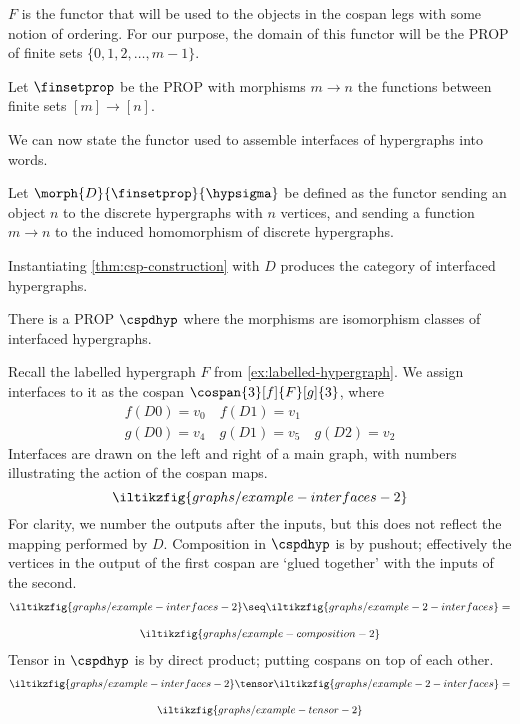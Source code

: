 \(F\) is the functor that will be used to the objects in the cospan legs with
some notion of ordering.
For our purpose, the domain of this functor will be the PROP of finite sets
\(\{0,1,2,\dots,m-1\}\).

\begin{definition}
    Let \(\finsetprop\) be the PROP with morphisms \(m \to n\) the functions
    between finite sets \([m] \to [n]\).
\end{definition}

We can now state the functor used to assemble interfaces of hypergraphs into
words.

\begin{definition}
    Let \(\morph{D}{\finsetprop}{\hypsigma}\) be defined as the functor sending
    an object \(n\) to the discrete hypergraphs with \(n\) vertices, and sending
    a function \(m \to n\) to the induced homomorphism of discrete
    hypergraphs.
\end{definition}

Instantiating \cref{thm:csp-construction} with \(D\) produces the category of
interfaced hypergraphs.

\begin{corollary}
    There is a PROP \(\cspdhyp\) where the morphisms are isomorphism classes of
    interfaced hypergraphs.
\end{corollary}

\begin{example}
    Recall the labelled hypergraph \(F\) from \cref{ex:labelled-hypergraph}.
    We assign interfaces to it as the cospan \(\cospan{3}[f]{F}[g]{3}\), where
    \begin{gather*}
        f(D0) = v_0 \quad f(D1) = v_1 \\
        g(D0) = v_4 \quad g(D1) = v_5 \quad g(D2) = v_2
    \end{gather*}
    Interfaces are drawn on the left and right of a main graph, with numbers
    illustrating the action of the cospan maps.
    \[
        \iltikzfig{graphs/example-interfaces-2}
    \]
    For clarity, we number the outputs after the inputs, but this does not
    reflect the mapping performed by \(D\).
    Composition in \(\cspdhyp\) is by pushout; effectively the vertices in the
    output of the first cospan are `glued together' with the inputs of the
    second.
    \begin{gather*}
        \iltikzfig{graphs/example-interfaces-2}
        \seq
        \iltikzfig{graphs/example-2-interfaces}
        =\\[1em]
        \iltikzfig{graphs/example-composition-2}
    \end{gather*}
    Tensor in \(\cspdhyp\) is by direct product; putting cospans on top of each
    other.
    \begin{gather*}
        \iltikzfig{graphs/example-interfaces-2}
        \tensor
        \iltikzfig{graphs/example-2-interfaces}
        =\\[1em]
        \iltikzfig{graphs/example-tensor-2}
    \end{gather*}
\end{example}


